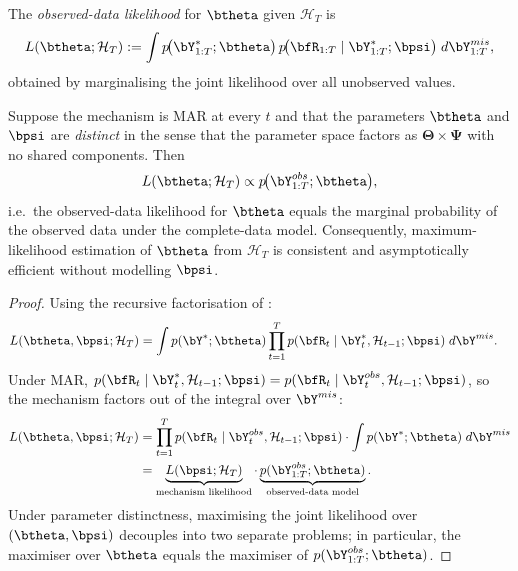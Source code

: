 \begin{definition}
\label{def:obs_likelihood}
The \emph{observed-data likelihood} for $\btheta$ given $\mathcal{H}_T$ is
\[
  L(\btheta;\mathcal{H}_T)
  := \int p\!\bigl(\bY_{1:T}^*;\btheta\bigr)\,
     p\!\bigl(\bfR_{1:T}\mid\bY_{1:T}^*;\bpsi\bigr)\;
     d\bY_{1:T}^{mis},
\]
obtained by marginalising the joint likelihood over all unobserved values.
\end{definition}

\begin{proposition}
\label{prop:ignorability}
Suppose the mechanism is MAR at every $t$ and that the parameters $\btheta$
and $\bpsi$ are \emph{distinct} in the sense that the parameter space
factors as $\bm{\Theta}\times\bm{\Psi}$ with no shared components.  Then
\[
  L(\btheta;\mathcal{H}_T)
  \propto p\!\bigl(\bY_{1:T}^{obs};\btheta\bigr),
\]
i.e.\ the observed-data likelihood for $\btheta$ equals the marginal
probability of the observed data under the complete-data model.
Consequently, maximum-likelihood estimation of $\btheta$ from $\mathcal{H}_T$
is consistent and asymptotically efficient without modelling $\bpsi$.
\end{proposition}

\begin{proof}
Using the recursive factorisation of :
\begin{align*}
  L(\btheta,\bpsi;\mathcal{H}_T)
  &= \int p(\bY^*;\btheta)\prod_{t=1}^T
     p(\bfR_t\mid\bY_t^*,\mathcal{H}_{t-1};\bpsi)\;d\bY^{mis}.
\end{align*}
Under MAR, $p(\bfR_t\mid\bY_t^*,\mathcal{H}_{t-1};\bpsi)
= p(\bfR_t\mid\bY_t^{obs},\mathcal{H}_{t-1};\bpsi)$, so the mechanism
factors out of the integral over $\bY^{mis}$:
\begin{align*}
  L(\btheta,\bpsi;\mathcal{H}_T)
  &= \prod_{t=1}^T p(\bfR_t\mid\bY_t^{obs},\mathcal{H}_{t-1};\bpsi)
     \cdot\int p(\bY^*;\btheta)\;d\bY^{mis} \\
  &= \underbrace{L(\bpsi;\mathcal{H}_T)}_{\text{mechanism likelihood}}
     \cdot\underbrace{p(\bY_{1:T}^{obs};\btheta)}_{\text{observed-data model}}.
\end{align*}
Under parameter distinctness, maximising the joint likelihood over
$(\btheta,\bpsi)$ decouples into two separate problems; in particular,
the maximiser over $\btheta$ equals the maximiser of
$p(\bY_{1:T}^{obs};\btheta)$.
\end{proof}

